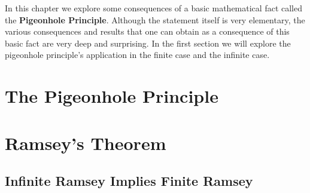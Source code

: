 In this chapter we explore some consequences of a basic mathematical fact called the \textbf{Pigeonhole Principle}. Although the statement itself is very elementary, the various consequences and results that one can obtain as a consequence of this basic fact are very deep and surprising. In the first section we will explore the pigeonhole principle's application in the finite case and the infinite case.

\section{The Pigeonhole Principle}


\section{Ramsey's Theorem}

\subsection{Infinite Ramsey Implies Finite Ramsey}

